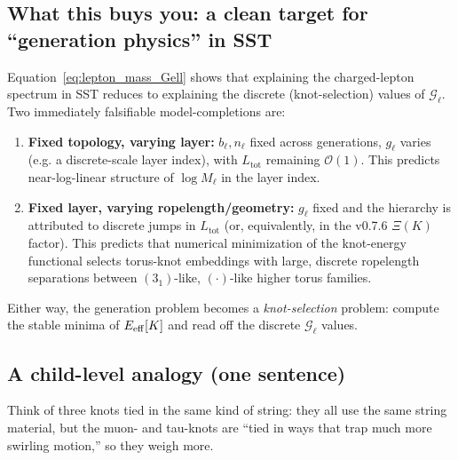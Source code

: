 \documentclass[10pt]{article}
\begin{document}
    \subsection{What this buys you: a clean target for ``generation physics'' in SST}

        Equation~\eqref{eq:lepton_mass_Gell} shows that explaining the charged-lepton spectrum in SST reduces to
        explaining the discrete (knot-selection) values of $\mathcal{G}_\ell$.
        Two immediately falsifiable model-completions are:

        \begin{enumerate}
            \item \textbf{Fixed topology, varying layer:} $b_\ell,n_\ell$ fixed across generations, $g_\ell$ varies
            (e.g. a discrete-scale layer index), with $L_{\text{tot}}$ remaining $\mathcal O(1)$.
            This predicts near-log-linear structure of $\log M_\ell$ in the layer index.
            \item \textbf{Fixed layer, varying ropelength/geometry:} $g_\ell$ fixed and the hierarchy is attributed to
            discrete jumps in $L_{\text{tot}}$ (or, equivalently, in the v0.7.6 $\Xi(K)$ factor).
            This predicts that numerical minimization of the knot-energy functional selects torus-knot embeddings with
            large, discrete ropelength separations between $(3_1)$-like, $(\cdot)$-like higher torus families.
        \end{enumerate}

        Either way, the generation problem becomes a \emph{knot-selection} problem: compute the stable minima of
        $E_{\rm eff}[K]$ and read off the discrete $\mathcal{G}_\ell$ values.

    \subsection*{A child-level analogy (one sentence)}
        Think of three knots tied in the same kind of string: they all use the same string material, but the muon- and tau-knots
        are ``tied in ways that trap much more swirling motion,'' so they weigh more.
\end{document}
